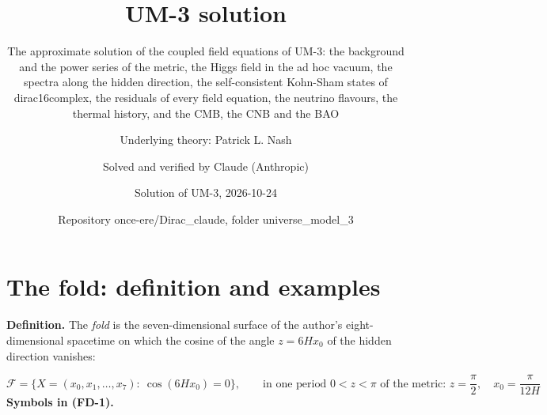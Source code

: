 \documentclass[
  10pt,
]{article}
\title{UM-3 solution}
\subtitle{The approximate solution of the coupled field equations of
UM-3: the background and the power series of the metric, the Higgs field
in the ad hoc vacuum, the spectra along the hidden direction, the
self-consistent Kohn-Sham states of dirac16complex, the residuals of
every field equation, the neutrino flavours, the thermal history, and
the CMB, the CNB and the BAO}
\author{Underlying theory: Patrick L. Nash \and Solved and verified by
Claude (Anthropic) \and Solution of UM-3, 2026-10-24 \and Repository
once-ere/Dirac\_claude, folder universe\_model\_3}
\date{}
\begin{document}
\maketitle

{
\hypersetup{linkcolor=}
\setcounter{tocdepth}{3}
\tableofcontents
}
\hypertarget{the-fold-definition-and-examples}{%
\section{The fold: definition and
examples}\label{the-fold-definition-and-examples}}

\textbf{Definition.} The \emph{fold} is the seven-dimensional surface of
the author's eight-dimensional spacetime on which the cosine of the
angle \(z = 6Hx_0\) of the hidden direction vanishes:

\[
\mathcal{F} = \big\{X = (x_0, x_1, \dots, x_7):\ \cos(6Hx_0) = 0\big\},\qquad
\text{in one period } 0 < z < \pi\text{ of the metric: } z = \frac{\pi}{2},\quad x_0 = \frac{\pi}{12H} \tag{FD-1}
\] \textbf{Symbols in (FD-1).}
\end{document}
